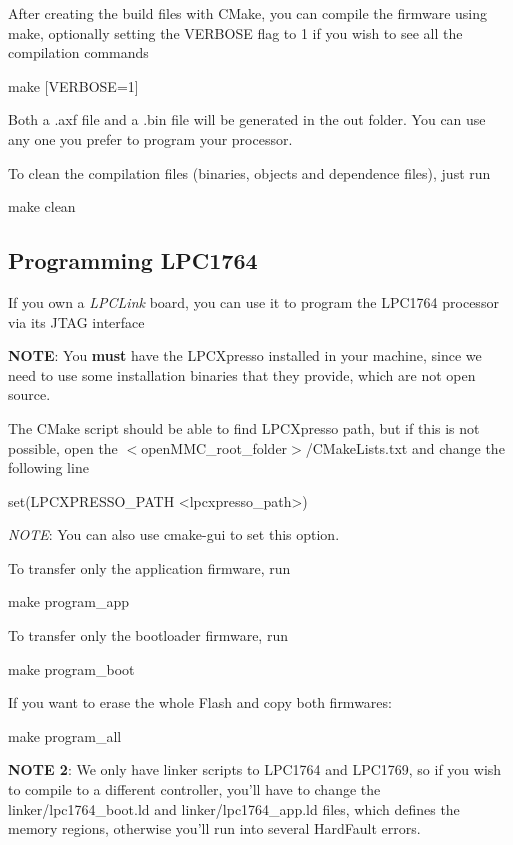 After creating the build files with C\-Make, you can compile the firmware using {\ttfamily make}, optionally setting the V\-E\-R\-B\-O\-S\-E flag to 1 if you wish to see all the compilation commands \begin{DoxyVerb}make [VERBOSE=1]
\end{DoxyVerb}


Both a {\ttfamily .axf} file and a {\ttfamily .bin} file will be generated in the {\ttfamily out} folder. You can use any one you prefer to program your processor.

To clean the compilation files (binaries, objects and dependence files), just run \begin{DoxyVerb}make clean
\end{DoxyVerb}


\subsection*{Programming L\-P\-C1764}

If you own a {\itshape L\-P\-C\-Link} board, you can use it to program the L\-P\-C1764 processor via its J\-T\-A\-G interface

{\bfseries N\-O\-T\-E}\-: You {\bfseries must} have the L\-P\-C\-Xpresso installed in your machine, since we need to use some installation binaries that they provide, which are not open source.

The C\-Make script should be able to find L\-P\-C\-Xpresso path, but if this is not possible, open the {\ttfamily $<$open\-M\-M\-C\-\_\-root\-\_\-folder$>$/\-C\-Make\-Lists.txt} and change the following line \begin{DoxyVerb}set(LPCXPRESSO_PATH <lpcxpresso_path>)
\end{DoxyVerb}


{\itshape N\-O\-T\-E}\-: You can also use cmake-\/gui to set this option.

To transfer only the application firmware, run \begin{DoxyVerb}make program_app
\end{DoxyVerb}


To transfer only the bootloader firmware, run \begin{DoxyVerb}make program_boot
\end{DoxyVerb}


If you want to erase the whole Flash and copy both firmwares\-: \begin{DoxyVerb}make program_all
\end{DoxyVerb}


{\bfseries N\-O\-T\-E 2}\-: We only have linker scripts to L\-P\-C1764 and L\-P\-C1769, so if you wish to compile to a different controller, you'll have to change the {\ttfamily linker/lpc1764\-\_\-boot.\-ld} and {\ttfamily linker/lpc1764\-\_\-app.\-ld} files, which defines the memory regions, otherwise you'll run into several Hard\-Fault errors. 